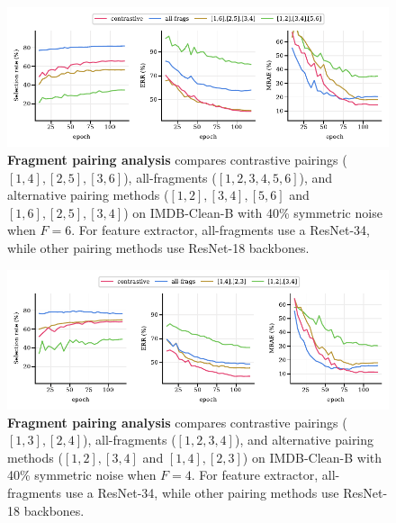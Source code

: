 \documentclass{article}
\theoremstyle{plain}
\theoremstyle{definition}
\theoremstyle{remark}
\begin{document}
\begin{figure}[th]
\begin{center}
\centerline{\includegraphics[width=\textwidth]{imgs/fragmentation_analysis_wide.pdf}}
\vskip -0.2in
\caption{
\textbf{Fragment pairing analysis} compares contrastive pairings ($[1,4], [2,5], [3,6]$), all-fragments ($[1,2,3,4,5,6]$),
and alternative pairing methods ($[1,2],[3,4],[5,6]$ and $[1,6],[2,5],[3,4]$) on IMDB-Clean-B with 40\% symmetric noise when $F=6$.
For feature extractor, all-fragments use a ResNet-34, while other pairing methods use ResNet-18 backbones.
}
\label{fig:contrasting_fragments}
\end{center}
\end{figure}

\begin{figure}[th]
\begin{center}
\centerline{\includegraphics[width=\textwidth]{imgs/fragmentation_analysis_wide_f4_full.pdf}}
\vskip -0.2in
\caption{
\textbf{Fragment pairing analysis} compares contrastive pairings ($[1,3], [2,4]$), all-fragments ($[1,2,3,4]$),
and alternative pairing methods ($[1,2],[3,4]$ and $[1,4],[2,3]$) on IMDB-Clean-B with 40\% symmetric noise when $F=4$.
For feature extractor, all-fragments use a ResNet-34, while other pairing methods use ResNet-18 backbones.
}
\label{fig:contrasting_fragments_f4}
\end{center}
\end{figure}
\end{document}
